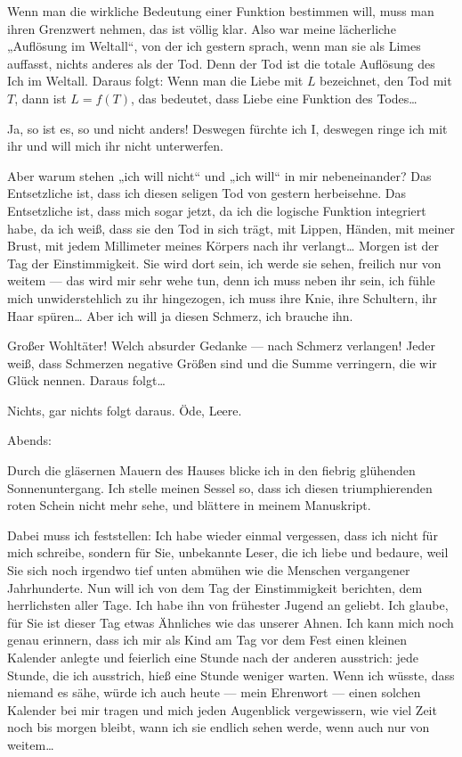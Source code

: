Wenn man die wirkliche Bedeutung einer Funktion bestimmen will,
muss man ihren Grenzwert nehmen, das ist völlig klar. Also war
meine lächerliche „Auflösung im Weltall“, von der ich gestern
sprach, wenn man sie als
Limes auffasst, nichts anderes als der Tod. Denn der Tod ist die
totale Auflösung des Ich im Weltall. Daraus folgt: Wenn man die
Liebe mit $L$ bezeichnet, den Tod mit $T$, dann ist $L = f(T)$, das
bedeutet, dass Liebe eine Funktion des Todes\ldots{}

Ja, so ist es, so und nicht anders! Deswegen fürchte ich I,
deswegen ringe ich mit ihr und will mich ihr nicht unterwerfen.

Aber warum stehen „ich will nicht“ und „ich will“ in mir
nebeneinander? Das Entsetzliche ist, dass ich diesen seligen Tod
von gestern herbeisehne. Das Entsetzliche ist, dass mich sogar
jetzt, da ich die logische Funktion integriert habe, da ich weiß,
dass sie den Tod in sich trägt, mit Lippen, Händen, mit meiner
Brust, mit jedem Millimeter meines Körpers nach ihr verlangt\ldots{}
Morgen ist der Tag der Einstimmigkeit. Sie wird dort sein, ich
werde sie sehen, freilich nur von weitem — das wird mir sehr wehe
tun, denn ich muss neben ihr sein, ich fühle mich unwiderstehlich
zu ihr hingezogen, ich muss ihre Knie, ihre Schultern, ihr Haar
spüren\ldots{} Aber ich will ja diesen Schmerz, ich brauche ihn.

Großer Wohltäter! Welch absurder Gedanke — nach Schmerz verlangen!
Jeder weiß, dass Schmerzen negative Größen sind und die Summe
verringern, die wir Glück nennen. Daraus folgt\ldots{}

Nichts, gar nichts folgt daraus. Öde, Leere.

Abends:

Durch die gläsernen Mauern des Hauses blicke ich in den fiebrig
glühenden Sonnenuntergang. Ich stelle meinen Sessel so, dass ich
diesen triumphierenden roten Schein nicht mehr sehe, und blättere
in meinem Manuskript.

Dabei muss ich feststellen: Ich habe wieder
einmal vergessen, dass ich nicht für mich schreibe, sondern für
Sie, unbekannte Leser, die ich liebe und bedaure, weil Sie sich
noch irgendwo tief unten abmühen wie die Menschen vergangener
Jahrhunderte. Nun will ich von dem Tag der Einstimmigkeit
berichten, dem herrlichsten aller Tage. Ich habe ihn von frühester
Jugend an geliebt. Ich glaube, für Sie ist dieser Tag etwas
Ähnliches wie das  unserer Ahnen. Ich kann mich noch genau
erinnern, dass ich mir als Kind am Tag vor dem Fest einen kleinen
Kalender anlegte und feierlich eine Stunde nach der anderen
ausstrich: jede Stunde, die ich ausstrich, hieß eine Stunde weniger
warten. Wenn ich wüsste, dass niemand es sähe, würde ich auch heute
— mein Ehrenwort — einen solchen Kalender bei mir tragen und mich
jeden Augenblick vergewissern, wie viel Zeit noch bis morgen
bleibt, wann ich sie endlich sehen werde, wenn auch nur von
weitem\ldots{}

